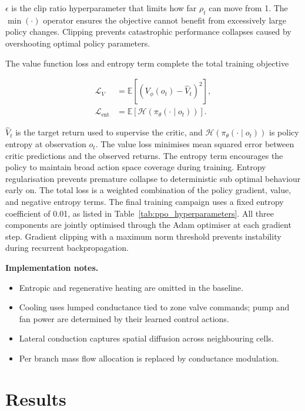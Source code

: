 \documentclass[twocolumn]{article}
\begin{document}
$\epsilon$ is the clip ratio hyperparameter that limits how far $\rho_t$ can move from 1. The $\min(\cdot)$ operator ensures the objective cannot benefit from excessively large policy changes. Clipping prevents catastrophic performance collapses caused by overshooting optimal policy parameters.

The value function loss and entropy term complete the total training objective

\begin{align}
\mathcal{L}_V &= \mathbb{E} \left[ (V_{\phi}(o_t) - \hat V_t)^2 \right], \label{eq:lv}\\
\mathcal{L}_{\mathrm{ent}} &= \mathbb{E} [\mathcal{H}(\pi_{\theta}(\cdot \mid o_t))] . \label{eq:lent}
\end{align}

$\hat V_t$ is the target return used to supervise the critic, and $\mathcal{H}(\pi_{\theta}(\cdot \mid o_t))$ is policy entropy at observation $o_t$. The value loss minimises mean squared error between critic predictions and the observed returns. The entropy term encourages the policy to maintain broad action space coverage during training. Entropy regularisation prevents premature collapse to deterministic sub optimal behaviour early on. The total loss is a weighted combination of the policy gradient, value, and negative entropy terms. The final training campaign uses a fixed entropy coefficient of 0.01, as listed in Table~\ref{tab:ppo_hyperparameters}. All three components are jointly optimised through the Adam optimiser at each gradient step. Gradient clipping with a maximum norm threshold prevents instability during recurrent backpropagation.

\bigskip

\noindent\textbf{Implementation notes.}
\begin{itemize}
  \item Entropic and regenerative heating are omitted in the baseline.
  \item Cooling uses lumped conductance tied to zone valve commands; pump and fan power are determined by their learned control actions.
  \item Lateral conduction captures spatial diffusion across neighbouring cells.
  \item Per branch mass flow allocation is replaced by conductance modulation.
\end{itemize}

\section*{Results}
\end{document}
